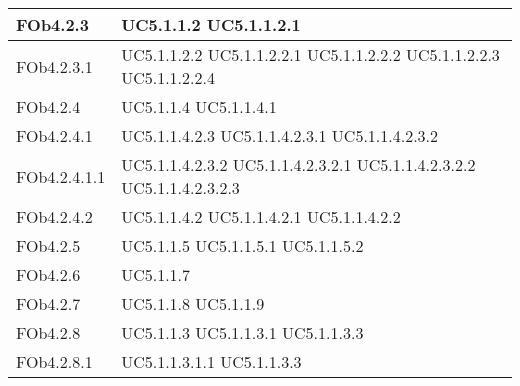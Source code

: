 \begin{longtable}{|l|l|}
\hline
FOb4.2.3 & UC5.1.1.2 \linebreak  UC5.1.1.2.1 \linebreak  \\ 
\hline
FOb4.2.3.1 & UC5.1.1.2.2 \linebreak  UC5.1.1.2.2.1 \linebreak  UC5.1.1.2.2.2 \linebreak  UC5.1.1.2.2.3 \linebreak  UC5.1.1.2.2.4 \linebreak  \\ 
\hline
FOb4.2.4 & UC5.1.1.4 \linebreak  UC5.1.1.4.1 \linebreak  \\ 
\hline
FOb4.2.4.1 & UC5.1.1.4.2.3 \linebreak  UC5.1.1.4.2.3.1 \linebreak  UC5.1.1.4.2.3.2 \linebreak  \\ 
\hline
FOb4.2.4.1.1 & UC5.1.1.4.2.3.2 \linebreak  UC5.1.1.4.2.3.2.1 \linebreak  UC5.1.1.4.2.3.2.2 \linebreak  UC5.1.1.4.2.3.2.3 \linebreak  \\ 
\hline
FOb4.2.4.2 & UC5.1.1.4.2 \linebreak  UC5.1.1.4.2.1 \linebreak  UC5.1.1.4.2.2 \linebreak  \\ 
\hline
FOb4.2.5 & UC5.1.1.5 \linebreak  UC5.1.1.5.1 \linebreak  UC5.1.1.5.2 \linebreak  \\ 
\hline
FOb4.2.6 & UC5.1.1.7 \linebreak  \\ 
\hline
FOb4.2.7 & UC5.1.1.8 \linebreak  UC5.1.1.9 \linebreak  \\ 
\hline
FOb4.2.8 & UC5.1.1.3 \linebreak  UC5.1.1.3.1 \linebreak  UC5.1.1.3.3 \linebreak  \\ 
\hline
FOb4.2.8.1 & UC5.1.1.3.1.1 \linebreak  UC5.1.1.3.3 \linebreak  \\ 

\end{longtable}
